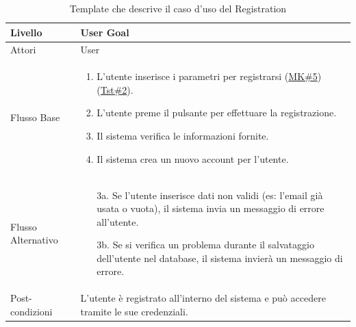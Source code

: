 \documentclass[10pt]{article}
\begin{document}
\begin{center}
\begin{table}[H]
{\begin{tabular}{|l|p{9cm}|}
Livello & User Goal \\ \hline
Attori & User \\ \hline
Flusso Base & 
\begin{enumerate}
    \item L'utente inserisce i parametri per registrarsi (\hyperref[mk5]{MK\#5})(\hyperref[test2]{Tst\#2}).
    \item L'utente preme il pulsante per effettuare la registrazione.
    \item Il sistema verifica le informazioni fornite.
    \item Il sistema crea un nuovo account per l’utente.
\end{enumerate} \\ \hline
Flusso Alternativo & 
\begin{enumerate}
    \item[3a.] Se l’utente inserisce dati non validi (es: l’email già usata o vuota), il sistema invia un messaggio di errore all’utente.
    \item[3b.] Se si verifica un problema durante il salvataggio dell’utente nel database, il sistema invierà un messaggio di errore.
\end{enumerate} \\ \hline
Post-condizioni & L’utente è registrato all’interno del sistema e può accedere tramite le sue credenziali. \\ \hline
\end{tabular}
}
\caption{Template che descrive il caso d'uso del Registration}
\end{table}
\begin{table}[H]
\vspace{-0.3cm}
\centering
{}
\end{table}
\end{center}
\end{document}

